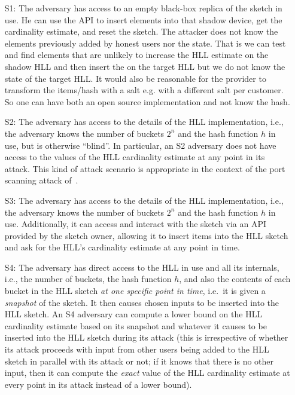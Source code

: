 \documentclass{IEEEtran}
\begin{document}
\begin{itemize}
\item[S1:] The adversary has access to an empty black-box replica of the sketch in use. He can use the API to insert elements into that shadow device, get the cardinality estimate, and reset the sketch. The attacker does not know the elements previously added by honest users nor the state. That is we can test and find elements that are unlikely to increase the HLL estimate on the shadow HLL and then insert the on the target HLL but we do not know the state of the target HLL. It would also be reasonable for the provider to transform the items/hash with  a salt e.g. with a different salt per customer. So one can have both an open source implementation and not know the hash.
\item[S2:] The adversary has access to the details of the HLL implementation, i.e., the adversary knows the number of buckets $2^n$ and the hash function $h$ in use, but is otherwise ``blind''. In particular, an S2 adversary does not have access to the values of the HLL cardinality estimate at any point in its attack. This kind of attack scenario is appropriate in the context of the port scanning attack of~\cite{portscanhll}.
\item[S3:] The adversary has access to the details of the HLL implementation, i.e., the adversary knows the number of buckets $2^n$ and the hash function $h$ in use. Additionally, it can access and interact with the sketch via an API provided by the sketch owner, allowing it to insert items into the HLL sketch and ask for the HLL's cardinality estimate at any point in time.
\item[S4:] The adversary has direct access to the HLL in use and all its internals, i.e., the number of buckets, the hash function $h$, and also the contents of each bucket in the HLL sketch \emph{at one specific point in time}, i.e.\ it is given a \emph{snapshot} of the sketch. It then causes chosen inputs to be inserted into the HLL sketch. An S4 adversary can compute a lower bound on the HLL cardinality estimate based on its snapshot and whatever it causes to be inserted into the HLL sketch during its attack (this is irrespective of whether its attack proceeds with input from other users being added to the HLL sketch in parallel with its attack or not; if it knows that there is no other input, then it can compute the \emph{exact} value of the HLL cardinality estimate at every point in its attack instead of a lower bound).
\end{itemize}
\end{document}
